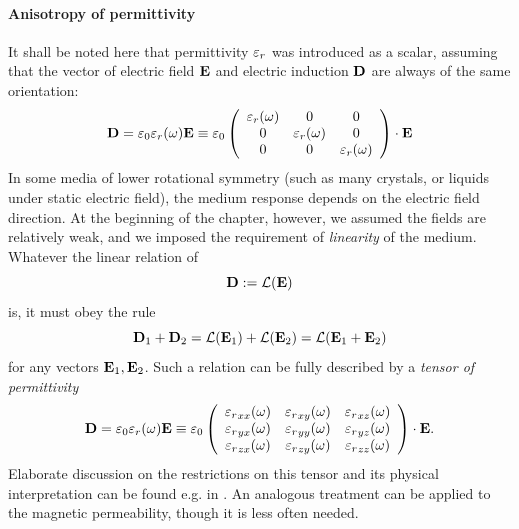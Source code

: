\paragraph{Anisotropy of permittivity} \label{par_anisotropy} %
It shall be noted here that permittivity $\varepsilon_r$ was introduced as a scalar, assuming that the vector of electric field $\mathbf{E}$ and electric induction $\mathbf{D}$ are always of the same orientation:
\begin{equation} \mathbf{D} = \varepsilon_0 \varepsilon_r(\omega) \mathbf{E} \equiv \varepsilon_0  
	\left(\begin{array}{ccc} 
			\varepsilon_r(\omega) & 0 & 0  \\
			0 & \varepsilon_r(\omega) & 0  \\
			0 & 0 &\varepsilon_r(\omega)  
	\end{array} \right) \cdot \mathbf{E}
	\label{eq_}
\end{equation}
In some media of lower rotational symmetry (such as many crystals, or liquids under static electric field), the medium response depends on the electric field direction. At the beginning of the chapter, however, we assumed the fields are relatively weak, and we imposed the requirement of \textit{linearity} of the medium. Whatever the linear relation of 
$$\mathbf{D} := \mathcal{L}(\mathbf{E})$$
is, it must obey the rule
$$\mathbf{D}_1 + \mathbf{D}_2 = \mathcal{L}(\mathbf{E}_1) + \mathcal{L}(\mathbf{E}_2) = \mathcal{L}(\mathbf{E}_1 + \mathbf{E}_2)$$
for any vectors $\mathbf{E}_1, \mathbf{E}_2$. Such a relation can be fully described by a \textit{tensor of permittivity} %
\begin{equation} \mathbf{D} = \varepsilon_0 \varepsilon_r(\omega) \mathbf{E} \equiv \varepsilon_0  
	\left(\begin{array}{ccc} 
	{\varepsilon_r}_{xx}(\omega) & {\varepsilon_r}_{xy}(\omega) & {\varepsilon_r}_{xz}(\omega)  \\
	{\varepsilon_r}_{yx}(\omega) & {\varepsilon_r}_{yy}(\omega) & {\varepsilon_r}_{yz}(\omega)  \\
	{\varepsilon_r}_{zx}(\omega) & {\varepsilon_r}_{zy}(\omega) & {\varepsilon_r}_{zz}(\omega)  
	\end{array} \right) \cdot \mathbf{E}.
	\label{eq_epstensor}
\end{equation}
Elaborate discussion on the restrictions on this tensor and its physical interpretation can be found e.g. in \cite[pp. 678--686]{born1999book}. An analogous treatment can be applied to the magnetic permeability, though it is less often needed.
